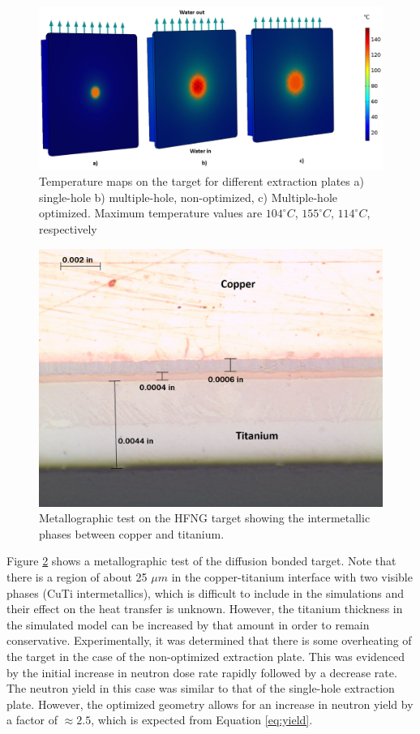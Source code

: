 \documentclass[review]{elsarticle}
\begin{document}
\begin{figure}
	\centering
	\includegraphics[height=0.5\textwidth]{pics/temp_profiles2}
	\caption{Temperature maps on the target for different extraction plates a) single-hole b) multiple-hole, non-optimized, c) Multiple-hole optimized. Maximum temperature values are $104^{\circ}C$,  $155^{\circ}C$,  $114^{\circ}C$, respectively}
	\label{fig:temp_comsol}
\end{figure}

\begin{figure}
	\centering
	\includegraphics[height=0.5\textwidth]{pics/TiCu2}
	\caption{Metallographic test on the HFNG target showing the intermetallic phases between copper and titanium.}
	\label{fig:TiCu}
\end{figure}

Figure \ref{fig:TiCu} shows a metallographic test of the diffusion bonded target. Note that there is a region of about 25 $\mu m$ in the copper-titanium interface with two visible phases (CuTi intermetallics), which is difficult to include in the simulations and their effect on the heat transfer is unknown. However, the titanium thickness in the simulated model can be increased by that amount in order to remain conservative. Experimentally, it was determined that there is some overheating of the target in the case of the non-optimized extraction plate. This was evidenced by the initial increase in neutron dose rate rapidly followed by a decrease rate. The neutron yield in this case was similar to that of the single-hole extraction plate. However, the optimized geometry allows for an increase in neutron yield by a factor of $\approx 2.5$, which is expected from Equation \ref{eq:yield}.      
 
\end{document}
